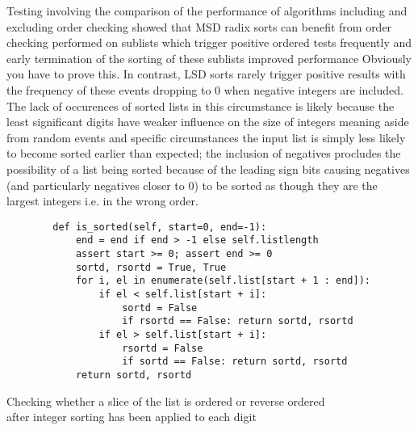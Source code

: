 \documentclass[12pt]{article}
\begin{document}
\par
Testing involving the comparison of the performance of algorithms including and excluding order checking showed that MSD radix sorts can benefit from order checking performed on sublists which trigger positive ordered tests frequently and early termination of the sorting of these sublists improved performance {\color{red} Obviously you have to prove this}. In contrast, LSD sorts rarely trigger positive results with the frequency of these events dropping to 0 when negative integers are included. The lack of occurences of sorted lists in this circumstance is likely because the least significant digits have weaker influence on the size of integers meaning aside from random events and specific circumstances the input list is simply less likely to become sorted earlier than expected; the inclusion of negatives procludes the possibility of a list being sorted because of the leading sign bits causing negatives (and particularly negatives closer to 0) to be sorted as though they are the largest integers i.e. in the wrong order. 
\par
\begin{table}[H]
	\centering
	\begin{lstlisting}
        def is_sorted(self, start=0, end=-1):
            end = end if end > -1 else self.listlength
            assert start >= 0; assert end >= 0
            sortd, rsortd = True, True
            for i, el in enumerate(self.list[start + 1 : end]):
                if el < self.list[start + i]:
                    sortd = False
                    if rsortd == False: return sortd, rsortd
                if el > self.list[start + i]:
                    rsortd = False
                    if sortd == False: return sortd, rsortd
            return sortd, rsortd
	\end{lstlisting}
	\caption*{Checking whether a slice of the list is ordered or reverse ordered \\after integer sorting has been applied to each digit}
\end{table}
\par

\pagebreak
\end{document}
